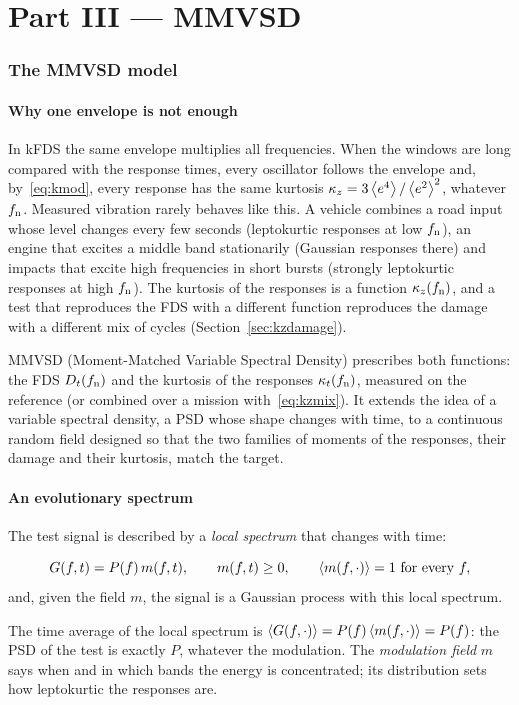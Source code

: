 \part*{Part III --- MMVSD}

\section{The MMVSD model}\label{sec:mmvsdmodel}

\subsection{Why one envelope is not enough}

In kFDS the same envelope multiplies all frequencies. When the windows are long compared with the
response times, every oscillator follows the envelope and, by~\eqref{eq:kmod}, every response has the
same kurtosis $\kappa_z = 3\left\langle e^4 \right\rangle/\left\langle e^2 \right\rangle^2$, whatever $f_{\mathrm{n}}$. Measured vibration rarely
behaves like this. A vehicle combines a road input whose level changes every few seconds (leptokurtic
responses at low $f_{\mathrm{n}}$), an engine that excites a middle band stationarily (Gaussian responses there)
and impacts that excite high frequencies in short bursts (strongly leptokurtic responses at high
$f_{\mathrm{n}}$). The kurtosis of the responses is a function $\kappa_z(f_{\mathrm{n}})$, and a test that reproduces the FDS
with a different function reproduces the damage with a different mix of cycles
(Section~\ref{sec:kzdamage}).

MMVSD (Moment-Matched Variable Spectral Density) prescribes both functions: the FDS $D_t(f_{\mathrm{n}})$ and the
kurtosis of the responses $\kappa_t(f_{\mathrm{n}})$, measured on the reference (or combined over a mission
with~\eqref{eq:kzmix}). It extends the idea of a variable spectral density, a PSD whose shape changes
with time, to a continuous random field designed so that the two families of moments of the
responses, their damage and their kurtosis, match the target.

\subsection{An evolutionary spectrum}\label{sec:evol}

The test signal is described by a \emph{local spectrum} that changes with time:
\begin{result}
\begin{equation}\label{eq:evol}
  G(f,t) = P(f)\,m(f,t),\qquad m(f,t)\ge0,\qquad \tavg{m(f,\cdot)} = 1 \ \text{for every } f,
\end{equation}
and, given the field $m$, the signal is a Gaussian process with this local spectrum.
\end{result}
The time average of the local spectrum is $\left\langle G(f,\cdot) \right\rangle = P(f)\left\langle m(f,\cdot) \right\rangle = P(f)$: the PSD
of the test is exactly $P$, whatever the modulation. The \emph{modulation field} $m$ says when and in
which bands the energy is concentrated; its distribution sets how leptokurtic the responses are.


